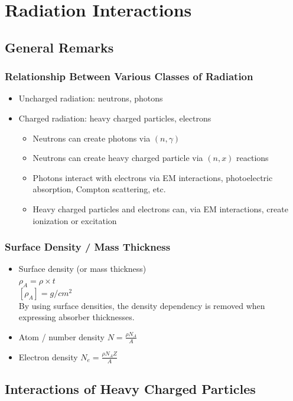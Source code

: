 \section{Radiation Interactions}
\subsection{General Remarks}
\subsubsection{Relationship Between Various Classes of Radiation}
\begin{itemize}
    \item Uncharged radiation: neutrons, photons
    \item Charged radiation: heavy charged particles, electrons
    \begin{itemize}
        \item Neutrons can create photons via $(n,\gamma)$
        \item Neutrons can create heavy charged particle via $(n,x)$ reactions
        \item Photons interact with electrons via EM interactions, photoelectric absorption, Compton scattering, etc.
        \item Heavy charged particles and electrons can, via EM interactions, create ionization or excitation 
    \end{itemize}
\end{itemize}
\subsubsection{Surface Density / Mass Thickness}
\begin{itemize}
    \item Surface density (or mass thickness)\\
    $\rho_A=\rho\times t$\\
    $[\rho_A]=g/cm^2$\\
    By using surface densities, the density dependency is removed when expressing absorber thicknesses.
    \item Atom / number density $N=\frac{\rho N_A}{A}$
    \item Electron density $N_e=\frac{\rho N_A Z}{A}$
\end{itemize}
\subsection{Interactions of Heavy Charged Particles}
